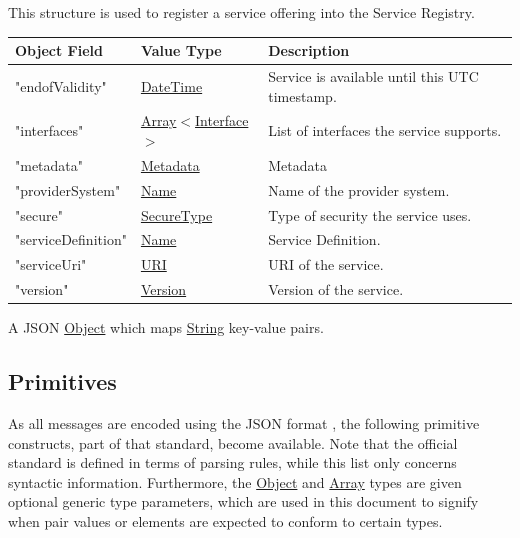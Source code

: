 \documentclass[a4paper]{arrowhead}
\newcommand{\pref}[1]{{\textcolor{ArrowheadGrey}{\hyperref[sec:model:primitives:#1]{#1}}}}
\begin{document}

This structure is used to register a service offering into the Service Registry.

\begin{table}[ht!]
\begin{tabularx}{\textwidth}{| p{4.25cm} | p{3.5cm} | X |} \hline
\rowcolor{gray!33} Object Field & Value Type      & Description \\ \hline
"endofValidity"                 & \pref{DateTime} & Service is available until this UTC timestamp. \\ \hline
"interfaces"                   & \pref{Array}$<$\pref{Interface}$>$     & List of interfaces the service supports. \\ \hline
"metadata"                  & \pref{Metadata}     & Metadata \\ \hline
"providerSystem"                    & \pref{Name} & Name of the provider system. \\ \hline
"secure"                    &\pref{SecureType}  & Type of security the service uses. \\ \hline
"serviceDefinition"         &\pref{Name}        & Service Definition. \\ \hline
"serviceUri"                &\pref{URI}         & URI of the service. \\ \hline
"version"                   &\pref{Version}     & Version of the service. \\ \hline
\end{tabularx}
\end{table}


A JSON \pref{Object} which maps \pref{String} key-value pairs.

\subsection{Primitives}
\label{sec:model:primitives}

As all messages are encoded using the JSON format \cite{bray2014json}, the following primitive constructs, part of that standard, become available.
Note that the official standard is defined in terms of parsing rules, while this list only concerns syntactic information.
Furthermore, the \pref{Object} and \pref{Array} types are given optional generic type parameters, which are used in this document to signify when pair values or elements are expected to conform to certain types. 
\end{document}
